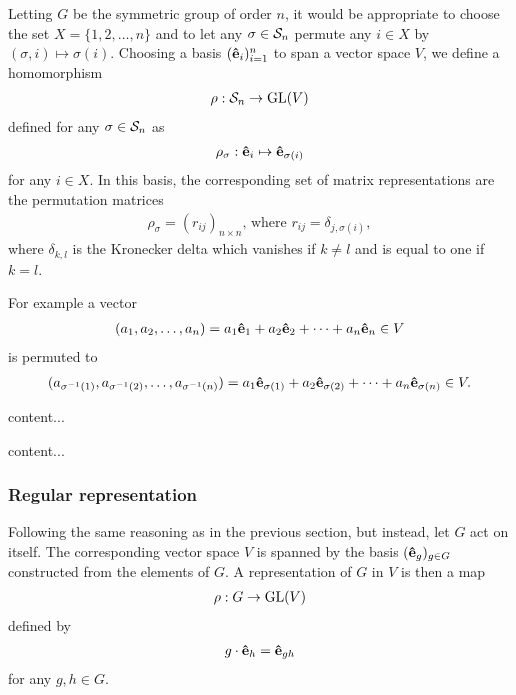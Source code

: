 	Letting $G$ be the symmetric group of order $n$, it would be appropriate to choose the set $X = \{1, 2, \dots, n\}$ and to let any $\sigma \in \mathcal{S}_n$ permute any $i \in X$ by $(\sigma, i) \mapsto \sigma(i)$. Choosing a basis $(\mathbf{\hat{e}}_i)_{i=1}^n$ to span a vector space $V$, we define a homomorphism
	\begin{align*}
		\rho: \mathcal{S}_n \rightarrow \text{GL}(V)
	\end{align*}
	defined for any $\sigma \in \mathcal{S}_n$ as
	\begin{align*}
		\rho_\sigma: \mathbf{\hat{e}}_i \mapsto \mathbf{\hat{e}}_{\sigma(i)}
	\end{align*}
	for any $i \in X$. In this basis, the corresponding set of matrix representations are the permutation matrices
	\begin{align*}
		\rho_\sigma = (r_{ij})_{n \times n} \text{, where } r_{ij} = \delta_{j,\sigma(i)},
	\end{align*}
	where $\delta_{k,l}$ is the Kronecker delta which vanishes if $k \neq l$ and is equal to one if $k=l$.
	
	For example a vector
	\begin{align*}
		(a_1, a_2, \dots, a_n) = a_1 \mathbf{\hat{e}}_1 + a_2 \mathbf{\hat{e}}_2 + \dots + a_n \mathbf{\hat{e}}_n \in V
	\end{align*}
	is permuted to 
	\begin{align*}
		(a_{\sigma^{-1}(1)}, a_{\sigma^{-1}(2)}, \dots, a_{\sigma^{-1}(n)}) = a_1 \mathbf{\hat{e}}_{\sigma(1)} + a_2 \mathbf{\hat{e}}_{\sigma(2)} + \dots + a_n \mathbf{\hat{e}}_{\sigma(n)}  \in V.
	\end{align*}
	
	
	\begin{example}
		content...
	\end{example}
	
	\begin{example}
		content...
	\end{example}

\subsubsection{Regular representation}

	Following the same reasoning as in the previous section, but instead, let $G$ act on itself. The corresponding vector space $V$ is spanned by the basis $(\mathbf{\hat{e}}_g)_{g \in G}$ constructed from the elements of $G$. A representation of $G$ in $V$ is then a map
	\begin{align*}
		\rho: G \rightarrow \text{GL}(V)
	\end{align*}
	defined by
	\begin{align*}
		g \cdot \mathbf{\hat{e}}_h = \mathbf{\hat{e}}_{gh}
	\end{align*}
	for any $g,h \in G$.
	
